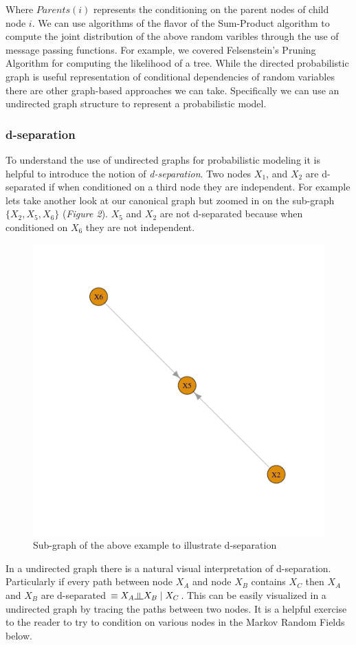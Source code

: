 \documentclass[12pt]{report}
\newcommand{\indep}{\rotatebox[origin=c]{90}{$\models$}}
\begin{document}
Where $Parents(i)$ represents the conditioning on the parent nodes of child node $i$. We can use algorithms of the flavor of the Sum-Product algorithm to compute the joint distribution of the above random varibles through the use of message passing functions. For example, we covered Felsenstein's Pruning Algorithm for computing the likelihood of a tree. While the directed probabilistic graph is useful representation of conditional dependencies of random variables there are other graph-based approaches we can take. Specifically we can use an undirected graph structure to represent a probabilistic model. 

\newpage
\subsubsection*{d-separation}

To understand the use of undirected graphs for probabilistic modeling it is helpful to introduce the notion of \textit{d-separation}. Two nodes $X_1$, and $X_2$ are d-separated if when conditioned on a third node they are independent. For example lets take another look at our canonical graph but zoomed in on the sub-graph $\{X_2, X_5, X_6\}$ (\textit{Figure 2}). $X_5$ and $X_2$ are not d-separated because when conditioned on $X_6$ they are not independent. 

\begin{figure}[h!]
\centering
\includegraphics[width=.38\textwidth]{figures/lec17_graph2.png} 
\caption{Sub-graph of the above example to illustrate d-separation} 
\end{figure} 

\newpage

In a undirected graph there is a natural visual interpretation of d-separation. Particularly if every path between node $X_{A}$ and node $X_{B}$ contains $X_{C}$ then $X_{A}$ and $X_{B}$ are d-separated $\equiv X_A \indep X_B \mid X_C$. This can be easily visualized in a undirected graph by tracing the paths between two nodes. It is a helpful exercise to the reader to try to condition on various nodes in the Markov Random Fields below. 
\end{document}
